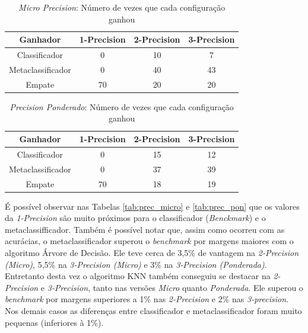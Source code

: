 \begin{table}[h!]
  \begin{center}
    \begin{tabular}{cccc}
      \hline
      \textbf{Ganhador} & \textbf{1-Precision} & \textbf{2-Precision} & \textbf{3-Precision}\\
      \hline

Classificador	&	0	&	10	&	7	\\
Metaclassificador	&	0	&	40	&	43	\\
Empate	&	70	&	20	&	20	\\

      \hline
    \end{tabular}
    \caption{\textit{Micro Precision}: Número de vezes que cada configuração ganhou}
    \label{tab:count_micro}
  \end{center}
\end{table}

\begin{table}[h!]
  \begin{center}
    \begin{tabular}{cccc}
      \hline
      \textbf{Ganhador} & \textbf{1-Precision} & \textbf{2-Precision} & \textbf{3-Precision}\\
      \hline

Classificador	&	0	&	15	&	12	\\
Metaclassificador	&	0	&	37	&	39	\\
Empate	&	70	&	18	&	19	\\

      \hline
    \end{tabular}
    \caption{\textit{Precision Ponderado}: Número de vezes que cada configuração ganhou}
    \label{tab:count_pon}
  \end{center}
\end{table}

É possível observar nas Tabelas \ref{tab:prec_micro} e \ref{tab:prec_pon} que os valores da \textit{1-Precision} são muito próximos para o classificador (\textit{Benckmark}) e o metaclassifficador.
Também é possível notar que, assim como ocorreu com as acurácias, o metaclassificador superou o \textit{benchmark} por margens maiores com o algoritmo Árvore de Decisão.
Ele teve cerca de 3,5\% de vantagem na \textit{2-Precision (Micro)}, 5,5\% na \textit{3-Precision (Micro)} e 3\% na \textit{3-Precision (Ponderada)}. 
Entretanto desta vez o algoritmo KNN também conseguiu se destacar na \textit{2-Precision} e \textit{3-Precision}, tanto nas versões \textit{Micro} quanto \textit{Ponderada}. 
Ele superou o \textit{benchmark} por margens superiores a 1\% nas \textit{2-Precision} e 2\% nas \textit{3-precision}.
Nos demais casos as diferenças entre classificador e metaclassificador foram muito pequenas (inferiores à 1\%).

